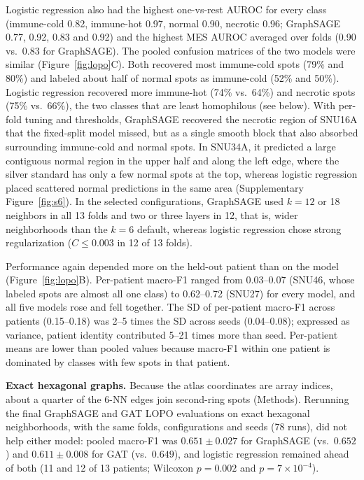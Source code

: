 \documentclass[11pt,letterpaper]{article}
\begin{document}
Logistic regression also had the highest one-vs-rest AUROC for every class (immune-cold 0.82, immune-hot 0.97, normal 0.90, necrotic 0.96; GraphSAGE 0.77, 0.92, 0.83 and 0.92) and the highest MES AUROC averaged over folds (0.90 vs.\ 0.83 for GraphSAGE). The pooled confusion matrices of the two models were similar (Figure~\ref{fig:lopo}C). Both recovered most immune-cold spots (79\% and 80\%) and labeled about half of normal spots as immune-cold (52\% and 50\%). Logistic regression recovered more immune-hot (74\% vs.\ 64\%) and necrotic spots (75\% vs.\ 66\%), the two classes that are least homophilous (see below). With per-fold tuning and thresholds, GraphSAGE recovered the necrotic region of SNU16A that the fixed-split model missed, but as a single smooth block that also absorbed surrounding immune-cold and normal spots. In SNU34A, it predicted a large contiguous normal region in the upper half and along the left edge, where the silver standard has only a few normal spots at the top, whereas logistic regression placed scattered normal predictions in the same area (Supplementary Figure~\ref{fig:s6}). In the selected configurations, GraphSAGE used $k = 12$ or 18 neighbors in all 13 folds and two or three layers in 12, that is, wider neighborhoods than the $k = 6$ default, whereas logistic regression chose strong regularization ($C \le 0.003$ in 12 of 13 folds).

Performance again depended more on the held-out patient than on the model (Figure~\ref{fig:lopo}B). Per-patient macro-F1 ranged from 0.03--0.07 (SNU46, whose labeled spots are almost all one class) to 0.62--0.72 (SNU27) for every model, and all five models rose and fell together. The SD of per-patient macro-F1 across patients (0.15--0.18) was 2--5 times the SD across seeds (0.04--0.08); expressed as variance, patient identity contributed 5--21 times more than seed. Per-patient means are lower than pooled values because macro-F1 within one patient is dominated by classes with few spots in that patient.

\textbf{Exact hexagonal graphs.} Because the atlas coordinates are array indices, about a quarter of the 6-NN edges join second-ring spots (Methods). Rerunning the final GraphSAGE and GAT LOPO evaluations on exact hexagonal neighborhoods, with the same folds, configurations and seeds (78 runs), did not help either model: pooled macro-F1 was $0.651 \pm 0.027$ for GraphSAGE (vs.\ $0.652$) and $0.611 \pm 0.008$ for GAT (vs.\ $0.649$), and logistic regression remained ahead of both (11 and 12 of 13 patients; Wilcoxon $p = 0.002$ and $p = 7 \times 10^{-4}$).
\end{document}
